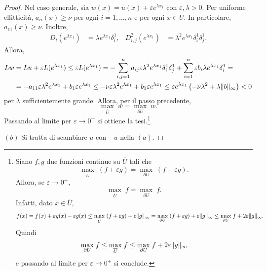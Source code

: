 \begin{teorema}
\begin{proof}
		Nel caso generale, sia $w(x) = u(x) + \varepsilon e^{\lambda x_1}$ con $\varepsilon,\lambda>0$. Per uniforme ellitticità, $a_{ii}(x) \ge \nu$ per ogni $i=1,\dots, n$ e per ogni $x \in U$. In particolare, $a_{11}(x) \ge \nu$. Inoltre,
		\begin{align*}
			D_i(e^{\lambda x_1}) &= \lambda e^{\lambda x_1} \delta_{i}^1, & D^2_{i,j}(e^{\lambda x_1}) &= \lambda^2 e^{\lambda x_1}\delta_{i}^1\delta_{j}^1. 
		\end{align*}
		Allora,
		\begin{align*}
			Lw &= Lu + \varepsilon L(e^{\lambda x_1}) \le \varepsilon L(e^{\lambda x_1}) = -\sum_{i,j=1}^{n}a_{ij}\varepsilon\lambda^2e^{\lambda x_1}\delta_{i}^1\delta_{j}^1 + \sum_{i=1}^{n}\varepsilon b_i\lambda e^{\lambda x_1} \delta_{i}^1 = \\
			&=-a_{11}\varepsilon \lambda^2 e^{\lambda x_1} + b_1\varepsilon e^{\lambda x_1} \le -\nu\varepsilon \lambda^2 e^{\lambda x_1} + b_1\varepsilon e^{\lambda x_1} \le \varepsilon e^{\lambda x_1}\left( -\nu\lambda^2 + \lambda \lVert b\rVert_\infty\right) <0
		\end{align*}
		per $\lambda$ sufficientemente grande. Allora, per il passo precedente,
		\[ \underset{\overline{U}}{\max} \; w = \underset{\partial U}{\max} \; w. \]
		Passando al limite per $\varepsilon \to 0^+$ si ottiene la tesi.\footnote{Siano $f,g$ due funzioni continue su $\overline{U}$ tali che 
			\[ \underset{\overline{U}}{\max} \; (f+\varepsilon g) = \underset{\partial U}{\max} \; (f+\varepsilon g). \]
			Allora, se $\varepsilon \to 0^+$,
			\[ \underset{\overline{U}}{\max} \; f = \underset{\partial U}{\max} \; f. \]
			Infatti, dato $x \in \overline{U}$,
			\[ f(x) = f(x) + \varepsilon g(x) - \varepsilon g(x) \le \underset{\overline{U}}{\max} \; (f+\varepsilon g) + \varepsilon \lVert g\rVert_\infty = \underset{\partial U}{\max} \; (f+\varepsilon g) + \varepsilon \lVert g\rVert_\infty \le \underset{\partial U}{\max} \; f + 2\varepsilon\lVert g\rVert_\infty.  \]
			Quindi 
			\[ \underset{\partial U}{\max} \; f \le \underset{\overline{U}}{\max} \; f \le \underset{\partial U}{\max} \; f + 2\varepsilon\lVert g\rVert_\infty \]
			e passando al limite per $\varepsilon \to 0^+$ si conclude.}
		\par\noindent
		$(b)$ Si tratta di scambiare $u$ con $-u$ nella $(a)$.
	\end{proof}
\end{teorema}
